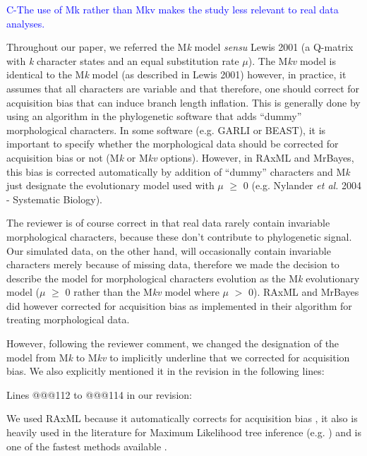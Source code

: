 \documentclass[11pt]{letter}
\begin{document}
\begin{letter}{}
\textcolor{blue}{C-The use of Mk rather than Mkv makes the study less relevant to real data analyses.}


Throughout our paper, we referred the M\textit{k} model \textit{sensu} Lewis 2001 (a Q-matrix with \textit{k} character states and an equal substitution rate $\mu$). The M\textit{kv} model is identical to the M\textit{k} model (as described in Lewis 2001) however, in practice, it assumes that all characters are variable and that therefore, one should correct for acquisition bias that can induce branch length inflation. This is generally done by using an algorithm in the phylogenetic software that adds ``dummy'' morphological characters. In some software (e.g. GARLI or BEAST), it is important to specify whether the morphological data should be corrected for acquisition bias or not (M\textit{k} or M\textit{kv} options). However, in RAxML and MrBayes, this bias is corrected automatically by addition of ``dummy'' characters and M\textit{k} just designate the evolutionary model used with $\mu$ $\geq$ 0 (e.g. Nylander \textit{et al.} 2004 - Systematic Biology). 

The reviewer is of course correct in that real data rarely contain invariable morphological characters, because these don't contribute to phylogenetic signal. Our simulated data, on the other hand, will occasionally contain invariable characters merely because of missing data, therefore we made the decision to describe the model for morphological characters evolution as the M\textit{k} evolutionary model ($\mu$ $\geq$ 0 rather than the M\textit{kv} model where $\mu$ $>$ 0). RAxML and MrBayes did however corrected for acquisition bias as implemented in their algorithm for treating morphological data.

However, following the reviewer comment, we changed the designation of the model from M\textit{k} to M\textit{kv} to implicitly underline that we corrected for acquisition bias. We also explicitly mentioned it in the revision in the following lines:

Lines @@@112 to @@@114 in our revision:

\hfill\begin{minipage}{\dimexpr\textwidth-1cm}
We used RAxML because it automatically corrects for acquisition bias \cite{lewisa2001}, it also is heavily used in the literature for Maximum Likelihood tree inference (e.g. \cite{rouresite-specific2011,Bogdanowicz2012,springermacroevolutionary2012,O'Leary08022013,kellymolecular2014}) and is one of the fastest methods available \cite{Stamatakis01102008}.
\end{minipage}


\end{letter}
\end{document}
